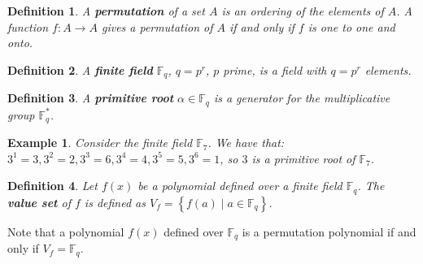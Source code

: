 \documentclass[landscape,final,paperwidth=48in,paperheight=36in]{baposter}
\newtheorem*{example*}{Example}
\newtheorem*{definition*}{Definition}
\begin{document}
\begin{poster}
{\begin{definition*}
  A \textbf{permutation} of a set $A$ is an ordering of the elements of $A$. A function $f: A \rightarrow A$ gives a permutation of $A$ if and only if $f$ is one to one and onto.
\end{definition*}

\begin{definition*}
  A \textbf{finite field} $\mathbb{F}_{q}$, $q=p^r$, $p$ prime, is a field with $q=p^r$ elements.
\end{definition*}

\begin{definition*}
  A \textbf{primitive root} $\alpha \in \mathbb{F}_q$ is a generator for the multiplicative group $\mathbb{F}_{q}^{*}$.
\end{definition*}

\begin{example*}
  Consider the finite field $\mathbb{F}_{7}$. We have that: $3^1 = 3, 3^2 = 2, 3^3 = 6, 3^4 = 4, 3^5 = 5, 3^6 = 1$, so $3$ is a primitive root of $\mathbb{F}_{7}$.
\end{example*}

\begin{definition*}
  Let $f(x)$ be a polynomial defined over a finite field $\mathbb{F}_{q}$. The \textbf{value set} of $f$ is defined as $V_{f} = \left\{f(a) \mid a \in \mathbb{F}_{q} \right\}$.
\end{definition*}

Note that a polynomial $f(x)$ defined over $\mathbb{F}_{q}$ is a permutation polynomial if and only if  $V_{f} = \mathbb{F}_{q}$.

   \vspace{0.3em}
}\label{Preliminaries}

\end{poster}
\end{document}
